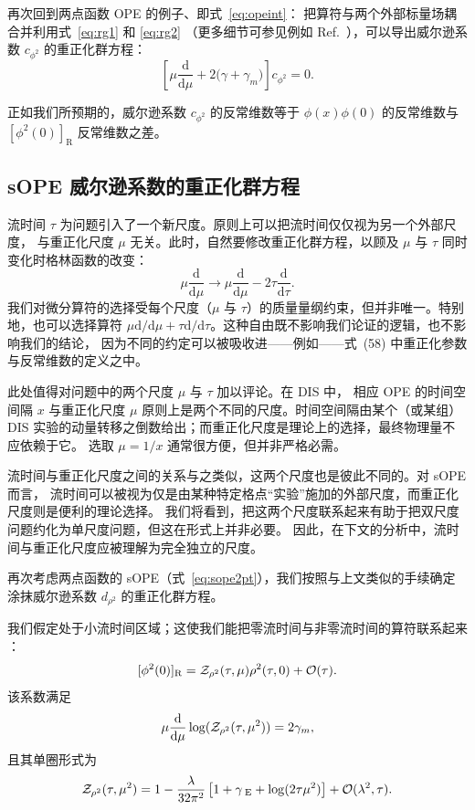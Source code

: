 再次回到两点函数 OPE 的例子、即式~\eqref{eq:opeint}：
把算符与两个外部标量场耦合并利用式~\eqref{eq:rg1} 和 \eqref{eq:rg2}
（更多细节可参见例如 Ref.~\cite{Collins:1984rdg}），可以导出威尔逊系数
$c_{\phi^2}$ 的重正化群方程：
\begin{equation}
\left[\mu\frac{\mathrm{d}}{\mathrm{d} \mu}
 + 2\big(\gamma +\gamma_m\big)\right]c_{\phi^2} = 0.
\end{equation}

正如我们所预期的，威尔逊系数 $c_{\phi^2}$ 的反常维数等于
$\phi(x)\phi(0)$ 的反常维数与 $[\phi^2(0)]_{\mathrm{R}}$ 反常维数之差。

\subsection{sOPE 威尔逊系数的重正化群方程}

流时间 $\tau$ 为问题引入了一个新尺度。原则上可以把流时间仅仅视为另一个外部尺度，
与重正化尺度 $\mu$ 无关。此时，自然要修改重正化群方程，以顾及 $\mu$ 与
$\tau$ 同时变化时格林函数的改变：
\begin{equation}
\mu\frac{\mathrm{d}}{\mathrm{d} \mu}\rightarrow
\mu\frac{\mathrm{d}}{\mathrm{d}
\mu}- 2\tau \frac{\mathrm{d}}{\mathrm{d} \tau}.
\end{equation}
我们对微分算符的选择受每个尺度（$\mu$ 与 $\tau$）的质量量纲约束，但并非唯一。特别地，也可以选择算符
$\mu\mathrm{d}/\mathrm{d}
\mu + \tau \mathrm{d}/\mathrm{d} \tau$。这种自由既不影响我们论证的逻辑，也不影响我们的结论，
因为不同的约定可以被吸收进——例如——式~(58)
中重正化参数与反常维数的定义之中。

此处值得对问题中的两个尺度 $\mu$ 与 $\tau$ 加以评论。在 DIS 中，
相应 OPE 的时间空间隔 $x$ 与重正化尺度 $\mu$ 原则上是两个不同的尺度。时间空间隔由某个（或某组）
DIS 实验的动量转移之倒数给出；而重正化尺度是理论上的选择，最终物理量不应依赖于它。
选取 $\mu = 1/x$ 通常很方便，但并非严格必需。

流时间与重正化尺度之间的关系与之类似，这两个尺度也是彼此不同的。对 sOPE 而言，
流时间可以被视为仅是由某种特定格点``实验''施加的外部尺度，而重正化尺度则是便利的理论选择。
我们将看到，把这两个尺度联系起来有助于把双尺度问题约化为单尺度问题，但这在形式上并非必要。
因此，在下文的分析中，流时间与重正化尺度应被理解为完全独立的尺度。

再次考虑两点函数的 sOPE（式~\eqref{eq:sope2pt}），我们按照与上文类似的手续确定涂抹威尔逊系数
$d_{\rho^2}$ 的重正化群方程。

我们假定处于小流时间区域；这使我们能把零流时间与非零流时间的算符联系起来
\cite{Makino:2014taa,Suzuki:2013gza,Luscher:2011bx}：
\begin{equation}\label{eq:smallt}
[\phi^2(0)]_{\mathrm{R}}  =   {\cal
Z}_{\rho^2}(\tau,\mu)\rho^2(\tau,0) + {\cal O}(\tau).
\end{equation}
该系数满足
\begin{equation}\label{eq:zgamma}
\mu\frac{\mathrm{d}}{\mathrm{d}\mu}\log({\cal
Z}_{\rho^2}(\tau,\mu^2)) = 2\gamma_m,
\end{equation}
且其单圈形式为
\begin{equation}
{\cal Z}_{\rho^2}(\tau,\mu^2)=
1-\frac{\lambda}{32\pi^2}\left[1+\gamma_{\;\mathrm{E}}+\log(2\tau
\mu^2)\right]+{\cal
O}(\lambda^2,\tau).
\end{equation}

